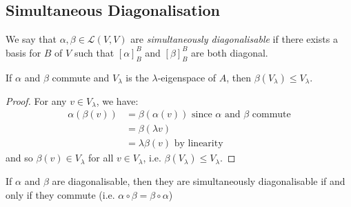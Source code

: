 \documentclass[../main.tex]{subfiles}
\begin{document}
\subsection{Simultaneous Diagonalisation}
\begin{definition}
  We say that $\alpha, \beta \in \mathcal{L}(V, V)$ are \textit{simultaneously diagonalisable} if there exists a basis for $B$ of $V$ such that $[\alpha]^{B}_{B}$ and $[\beta]^{B}_{B}$ are both diagonal.
\end{definition}
\begin{lemma}
  If $\alpha$ and $\beta$ commute and $V_{\lambda}$ is the $\lambda$-eigenspace of $A$, then $\beta(V_{\lambda}) \leq V_{\lambda}$. \label{eigenSpaceLemma}
\end{lemma}
\begin{proof}
  For any $v \in V_{\lambda}$, we have:
  \begin{align*}
    \alpha(\beta(v)) &= \beta(\alpha(v)) \text{ since $\alpha$ and $\beta$ commute}\\
                     &= \beta(\lambda v) \\
                     &= \lambda \beta(v) \text{ by linearity}
  \end{align*}
  and so $\beta(v) \in V_{\lambda}$ for all $v \in V_{\lambda}$, i.e. $\beta(V_{\lambda}) \leq V_{\lambda}$.
\end{proof}
\begin{theorem}
  If $\alpha$ and $\beta$ are diagonalisable, then they are simultaneously diagonalisable if and only if they commute (i.e. $\alpha \circ \beta = \beta \circ \alpha$)
\end{theorem}
\end{document}
